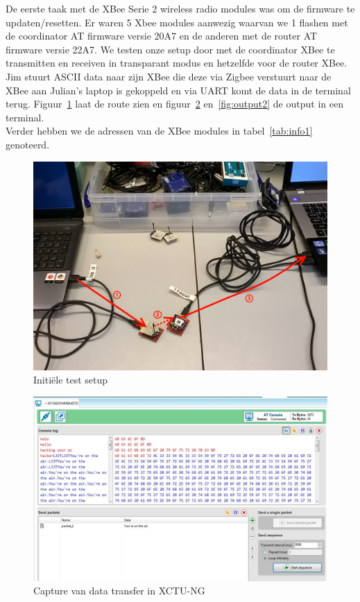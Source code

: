 \documentclass[12pt]{article}
\begin{document}
De eerste taak met de XBee Serie 2 wireless radio modules was om de firmware te updaten/resetten. Er waren 5 Xbee modules aanwezig waarvan we 1 flashen met de coordinator AT firmware versie 20A7 en de anderen met de router AT firmware versie 22A7. We testen onze setup door met de coordinator XBee te transmitten en receiven in transparant modus en hetzelfde voor de router XBee. Jim stuurt ASCII data naar zijn XBee die deze via Zigbee verstuurt naar de XBee aan Julian's laptop is gekoppeld en via UART komt de data in de terminal terug. Figuur~\ref{fig:setup1} laat de route zien en figuur~\ref{fig:output1} en~\ref{fig:output2} de output in een terminal.\\
Verder hebben we de adressen van de XBee modules in tabel~\ref{tab:info1} genoteerd. \\
\begin{center}
\begin{figure}[h]
\includegraphics[scale=.25]{Test_Setup_1.jpg}
\caption{Initiële test setup}
\label{fig:setup1}
\end{figure}
\end{center}
\begin{center}
\begin{figure}[h]
\includegraphics[scale=.6]{Serial_Capture.JPG}
\caption{Capture van data transfer in XCTU-NG}
\label{fig:output1}
\end{figure}
\end{center}
\end{document}

